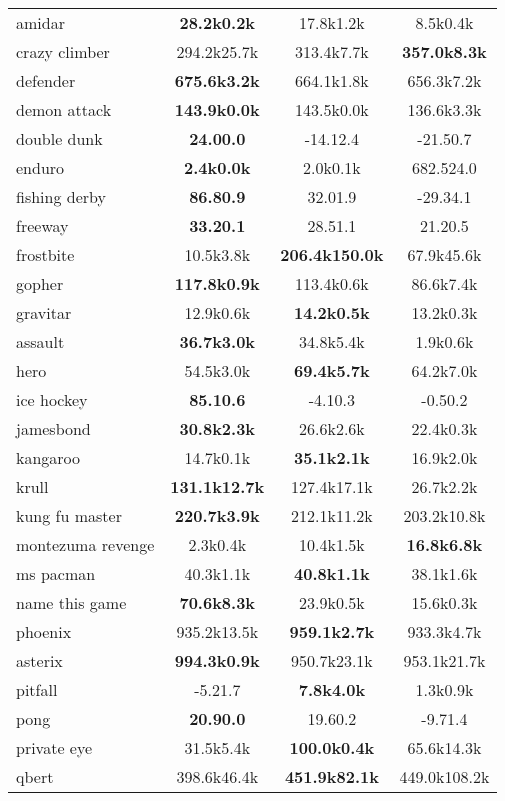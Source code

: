 \documentclass{article} \usepackage{iclr2020_conference,times}
\begin{document}
\begin{table}[ht!]
\begin{tabular}{l|c|c|c}
amidar  & \textbf{28.2k0.2k} & 17.8k1.2k & 8.5k0.4k \\
crazy climber  & 294.2k25.7k & 313.4k7.7k & \textbf{357.0k8.3k} \\
defender  & \textbf{675.6k3.2k} & 664.1k1.8k & 656.3k7.2k \\
demon attack  & \textbf{143.9k0.0k} & 143.5k0.0k & 136.6k3.3k \\
double dunk  & \textbf{24.00.0} & -14.12.4 & -21.50.7 \\
enduro  & \textbf{2.4k0.0k} & 2.0k0.1k & 682.524.0 \\
fishing derby  & \textbf{86.80.9} & 32.01.9 & -29.34.1 \\
freeway  & \textbf{33.20.1} & 28.51.1 & 21.20.5 \\
frostbite  & 10.5k3.8k & \textbf{206.4k150.0k} & 67.9k45.6k \\
gopher  & \textbf{117.8k0.9k} & 113.4k0.6k & 86.6k7.4k \\
gravitar  & 12.9k0.6k & \textbf{14.2k0.5k} & 13.2k0.3k \\
assault  & \textbf{36.7k3.0k} & 34.8k5.4k & 1.9k0.6k \\
hero  & 54.5k3.0k & \textbf{69.4k5.7k} & 64.2k7.0k \\
ice hockey  & \textbf{85.10.6} & -4.10.3 & -0.50.2 \\
jamesbond  & \textbf{30.8k2.3k} & 26.6k2.6k & 22.4k0.3k \\
kangaroo  & 14.7k0.1k & \textbf{35.1k2.1k} & 16.9k2.0k \\
krull  & \textbf{131.1k12.7k} & 127.4k17.1k & 26.7k2.2k \\
kung fu master  & \textbf{220.7k3.9k} & 212.1k11.2k & 203.2k10.8k \\
montezuma revenge  & 2.3k0.4k & 10.4k1.5k & \textbf{16.8k6.8k} \\
ms pacman  & 40.3k1.1k & \textbf{40.8k1.1k} & 38.1k1.6k \\
name this game  & \textbf{70.6k8.3k} & 23.9k0.5k & 15.6k0.3k \\
phoenix  & 935.2k13.5k & \textbf{959.1k2.7k} & 933.3k4.7k \\
asterix  & \textbf{994.3k0.9k} & 950.7k23.1k & 953.1k21.7k \\
pitfall  & -5.21.7 & \textbf{7.8k4.0k} & 1.3k0.9k \\
pong  & \textbf{20.90.0} & 19.60.2 & -9.71.4 \\
private eye  & 31.5k5.4k & \textbf{100.0k0.4k} & 65.6k14.3k \\
qbert  & 398.6k46.4k & \textbf{451.9k82.1k} & 449.0k108.2k \\

\end{tabular}
\end{table}
\end{document}
